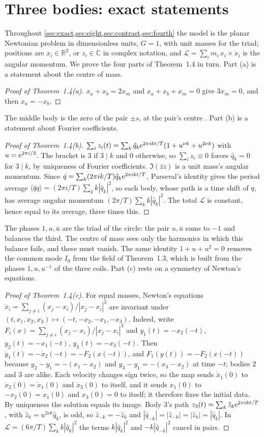 \documentclass[11pt]{article}
\theoremstyle{definition}\newtheorem{definition}[theorem]{Definition}
\theoremstyle{remark}\newtheorem{remark}[theorem]{Remark}
\newcommand{\R}{\mathbb R}\newcommand{\C}{\mathbb C}\newcommand{\N}{\mathbb N}
\begin{document}
\section{Three bodies: exact statements}\label{sec:exact}
Throughout \cref{sec:exact,sec:eight,sec:contrast,sec:fourth} the model is the planar Newtonian problem in dimensionless units, $G=1$, with unit masses for the triad; positions are $x_i\in\R^2$, or $z_i\in\C$ in complex notation, and $\mathcal L=\sum_im_i\,x_i\times\dot x_i$ is the angular momentum. We prove the four parts of Theorem~1.4 in turn. Part (a) is a statement about the centre of mass.
\begin{proof}[Proof of Theorem~1.4(a)]
$x_a+x_b=2x_m$ and $x_a+x_b+x_m=0$ give $3x_m=0$, and then $x_a=-x_b$.
\end{proof}
The middle body is the zero of the pair $\pm s$, at the pair's centre \cite{SZero}. Part (b) is a statement about Fourier coefficients.
\begin{proof}[Proof of Theorem~1.4(b)]
$\sum_iz_i(t)=\sum_k\hat q_k\mathrm e^{2\pi ikt/T}(1+u^{\nu k}+u^{2\nu k})$ with $u=\mathrm e^{2\pi i/3}$. The bracket is $3$ if $3\mid k$ and $0$ otherwise, so $\sum_i z_i\equiv0$ forces $\hat q_k=0$ for $3\mid k$, by uniqueness of Fourier coefficients. $\Im(\bar z\dot z)$ is a unit mass's angular momentum. Since $\dot q=\sum_k(2\pi ik/T)\hat q_k\mathrm e^{2\pi ikt/T}$, Parseval's identity gives the period average $\langle\bar q\dot q\rangle=(2\pi i/T)\sum_kk|\hat q_k|^2$, so each body, whose path is a time shift of $q$, has average angular momentum $(2\pi/T)\sum_kk|\hat q_k|^2$. The total $\mathcal L$ is constant, hence equal to its average, three times this.
\end{proof}
The phases $1,u,\bar u$ are the triad of the circle: the pair $u,\bar u$ sums to $-1$ and balances the third. The centre of mass sees only the harmonics in which this balance fails, and these must vanish. The same identity $1+u+u^2=0$ removes the common mode $I_0$ from the field of Theorem~1.3, which is built from the phases $1,u,u^{-1}$ of the three coils. Part (c) rests on a symmetry of Newton's equations.
\begin{proof}[Proof of Theorem~1.4(c)]
For equal masses, Newton's equations $\ddot x_i=\sum_{j\ne i}(x_j-x_i)/|x_j-x_i|^3$ are invariant under $(t,x_1,x_2,x_3)\mapsto(-t,-x_2,-x_1,-x_3)$. Indeed, write $F_i(x)=\sum_{j\ne i}(x_j-x_i)/|x_j-x_i|^3$ and $y_1(t)=-x_2(-t)$, $y_2(t)=-x_1(-t)$, $y_3(t)=-x_3(-t)$. Then $\ddot y_1(t)=-\ddot x_2(-t)=-F_2(x(-t))$, and $F_1(y(t))=-F_2(x(-t))$ because $y_2-y_1=-(x_1-x_2)$ and $y_3-y_1=-(x_3-x_2)$ at time $-t$; bodies 2 and 3 are alike. Each velocity changes sign twice, so the map sends $\dot x_1(0)$ to $\dot x_2(0)=\dot x_1(0)$ and $\dot x_3(0)$ to itself, and it sends $x_1(0)$ to $-x_2(0)=x_1(0)$ and $x_3(0)=0$ to itself; it therefore fixes the initial data. By uniqueness the solution equals its image. Body 3's path $z_3(t)=\sum_k\hat z_k\mathrm e^{2\pi ikt/T}$, with $\hat z_k=u^{2\nu k}\hat q_k$, is odd, so $\hat z_{-k}=-\hat z_k$ and $|\hat q_{-k}|=|\hat z_{-k}|=|\hat z_k|=|\hat q_k|$. In $\mathcal L=(6\pi/T)\sum_kk|\hat q_k|^2$ the terms $k|\hat q_k|^2$ and $-k|\hat q_{-k}|^2$ cancel in pairs.
\end{proof}
\end{document}
